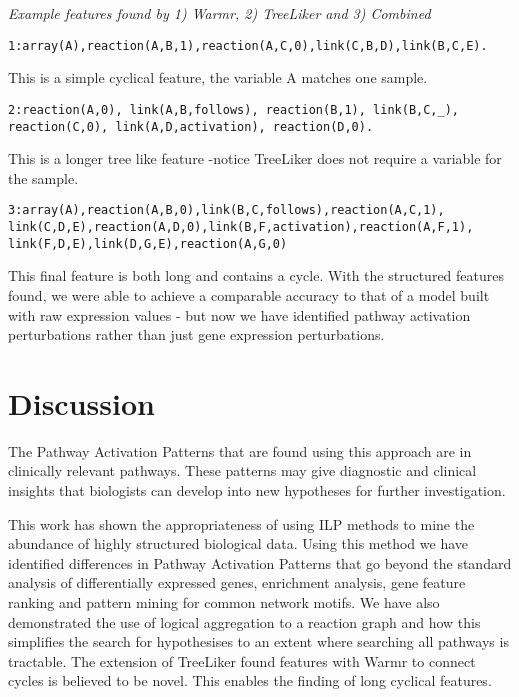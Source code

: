 \documentclass[runningheads,a4paper]{llncs}
\begin{document}
\noindent
{\it{Example features found by 1) Warmr, 2) TreeLiker and 3) Combined}}
\begin{verbatim}
1:array(A),reaction(A,B,1),reaction(A,C,0),link(C,B,D),link(B,C,E).
\end{verbatim}
\noindent 
This is a simple cyclical feature, the variable A matches one sample. 

\noindent

\begin{verbatim}
2:reaction(A,0), link(A,B,follows), reaction(B,1), link(B,C,_),    
reaction(C,0), link(A,D,activation), reaction(D,0).
\end{verbatim}
\noindent 
This is a longer tree like feature -notice TreeLiker does not require a variable for the sample.  

\noindent

\begin{verbatim}
3:array(A),reaction(A,B,0),link(B,C,follows),reaction(A,C,1),
link(C,D,E),reaction(A,D,0),link(B,F,activation),reaction(A,F,1),
link(F,D,E),link(D,G,E),reaction(A,G,0)
\end{verbatim}
\noindent
This final feature is both long and contains a cycle. With the structured features found, we were able to achieve a comparable accuracy to that of a model built with raw expression values - but now we have identified pathway activation perturbations rather than just gene expression perturbations. 

\section{Discussion}
The Pathway Activation Patterns that are found using this approach are in clinically relevant pathways. These patterns may give diagnostic and clinical insights that biologists can develop into new hypotheses for further investigation. 

This work has shown the appropriateness of using ILP methods to mine the abundance of highly structured biological data. Using this method we have identified differences in Pathway Activation Patterns that go beyond the standard analysis of differentially expressed genes, enrichment analysis, gene feature ranking and pattern mining for common network motifs. We have also demonstrated the use of logical aggregation to a  reaction graph and how this simplifies the search for hypothesises to an extent where searching all pathways is tractable. The extension of TreeLiker found features with Warmr to connect cycles is believed to be novel. This enables the finding of long cyclical features. 
\newline
\end{document}
